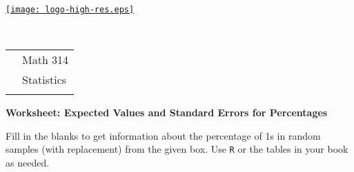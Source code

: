 \documentclass[10pt]{article}
\begin{document}
\pagestyle{empty}
\lstset{language=R, showspaces=false, showstringspaces=false}


\newcommand{\zobox}[2]{\begin{pspicture}(-0.2,0.2)(2.4,1.3)
\rput[r](-0.08,0.35){\small #1\vphantom{,'}}\psframe(0.0,0.05)(0.5,0.65)\rput(0.25,0.35){0}
   \rput[l](0.58,0.35){s\vphantom{',1}}
\rput[r](1.74,0.35){\small #2\vphantom{,'}}\psframe(1.8,0.05)(2.3,0.65)\rput(2.05,0.35){1}
   \rput[l](2.38,0.35){s\vphantom{',1}}
\psline(-0.9,0.9)(-0.9,-0.2)(2.8,-0.2)(2.8,0.9)(-0.9,0.9)
\end{pspicture}}

\pagestyle{empty}
\lstset{language=R, showspaces=false, showstringspaces=false}

\href{http://www.shepherd.edu}{\texttt{[image: logo-high-res.eps]}}
\vspace{-1.79cm}

{\small{\ }\hfill
\begin{tabular}{cl}
& Math 314\\
& Statistics\\
\hspace{5.28in} & %
\end{tabular}
}
\setlength{\baselineskip}{1.05\baselineskip}
\medskip

\begin{center}
\textbf{\large  Worksheet:  Expected Values and Standard Errors for Percentages}
\end{center}
\smallskip

Fill in the blanks to get information about the percentage of 1s in 
random samples (with replacement) from the given box. 
Use \texttt{R} or the tables in your book as needed.%
\end{document}
